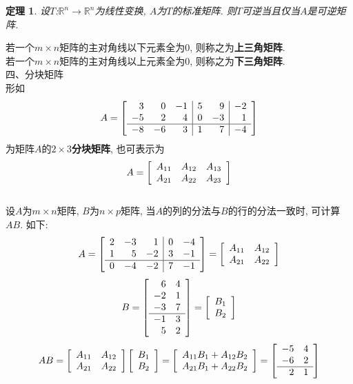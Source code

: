 \documentclass[UTF8,fontset=ubuntu]{ctexart}
\theoremstyle{plain}
\newtheorem{theorem}{定理}
\theoremstyle{nonumberplain}
\theoremstyle{empty}
\begin{document}
\begin{theorem}
设$T$:$\mathbb{R}^n\rightarrow\mathbb{R}^n$为线性变换, $A$为$T$的标准矩阵. 则$T$可逆当且仅当$A$是可逆矩阵.
\end{theorem}\vspace{2ex}

若一个$m\times n$矩阵的主对角线以下元素全为0, 则称之为\textbf{上三角矩阵}.\\[1ex]
若一个$m\times n$矩阵的主对角线以上元素全为0, 则称之为\textbf{下三角矩阵}.\\[4ex]

四、分块矩阵\\[1ex]
形如
\[A=\left[
\begin{array}{r r r|r r|r}
3 & 0 & -1 & 5 & 9 & -2\\
-5 & 2 & 4 & 0 & -3 & 1\\\hline
-8 & -6 & 3 & 1 & 7 & -4
\end{array}
\right]\]
为矩阵$A$的$2\times 3$\textbf{分块矩阵}, 也可表示为
\[A=\left[
\begin{array}{l l l}
A_{11} & A_{12} & A_{13}\\
A_{21} & A_{22} & A_{23}
\end{array}
\right]\]\\[2ex]

设$A$为$m\times n$矩阵, $B$为$n\times p$矩阵, 当$A$的列的分法与$B$的行的分法一致时, 可计算$AB$. 如下:
\[A=\left[\begin{array}{r r r|r r}
2 & -3 & 1 & 0 & -4\\
1 & 5 & -2 & 3 & -1\\\hline
0 & -4 & -2 & 7 & -1
\end{array}\right]=
\left[\begin{array}{l l}
A_{11} & A_{12}\\
A_{21} & A_{22}
\end{array}\right]\]
\[B=\left[\begin{array}{r r}
6 & 4\\
-2 & 1\\
-3 & 7\\\hline
-1 & 3\\
5 & 2
\end{array}\right]=
\left[\begin{array}{l}
B_1\\
B_2
\end{array}\right]\]
\[AB=\left[
\begin{array}{l l}
A_{11} & A_{12}\\
A_{21} & A_{22}
\end{array}
\right]\left[
\begin{array}{l}
B_1\\
B_2
\end{array}
\right]=\left[
\begin{array}{l}
A_{11}B_1+A_{12}B_2\\
A_{21}B_1+A_{22}B_2
\end{array}
\right]=\left[
\begin{array}{r r}
-5 & 4\\
-6 & 2\\\hline
2 & 1
\end{array}
\right]\]\\[2ex]
\end{document}
